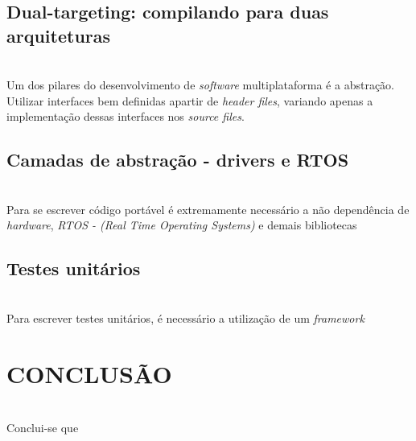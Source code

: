 \documentclass[times, twoside, watermark]{artigo}
\begin{document}
\subsection{Dual-targeting: compilando para duas arquiteturas}\hfill\\
Um dos pilares do desenvolvimento de \textit{software} multiplataforma é a abstração.
Utilizar interfaces bem definidas apartir de \textit{header files}, variando apenas
a implementação dessas interfaces nos \textit{source files}.



\subsection{Camadas de abstração - drivers e RTOS}\hfill\\
Para se escrever código portável é extremamente necessário a não dependência de 
\textit{hardware}, \textit{RTOS - (Real Time Operating Systems)} e demais bibliotecas


\subsection{Testes unitários}\hfill\\
Para escrever testes unitários, é necessário a utilização de um \textit{framework}



\section*{CONCLUSÃO}\hfill\\
Conclui-se que 


\section*{}


\cite{martin2009clean}
\cite{martin2018clean}
\cite{denardin2019sistemas}
\end{document}
